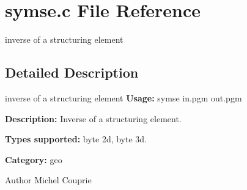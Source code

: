 \section{symse.c File Reference}
\label{symse_8c}


inverse of a structuring element  




\subsection{Detailed Description}
inverse of a structuring element {\bfseries Usage:} symse in.pgm out.pgm

{\bfseries Description:} Inverse of a structuring element.

{\bfseries Types supported:} byte 2d, byte 3d.

{\bfseries Category:} geo

\begin{DoxyAuthor}{Author}
Michel Couprie 
\end{DoxyAuthor}
